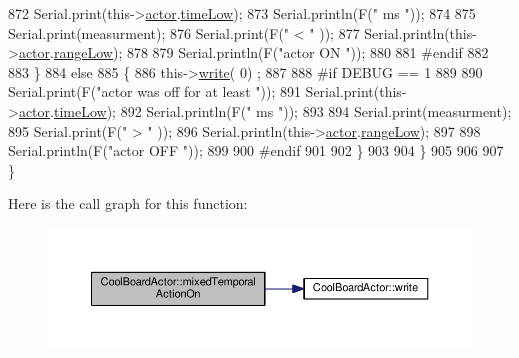 \begin{DoxyCode}
872             Serial.print(this->\hyperlink{class_cool_board_actor_a8f190db9f7a39fddbcef7f152da970e9}{actor}.\hyperlink{struct_cool_board_actor_1_1state_a314c53c146e8c7b12c025323a34fbb9a}{timeLow});
873             Serial.println(F(\textcolor{stringliteral}{" ms "}));
874 
875             Serial.print(measurment);
876             Serial.print(F(\textcolor{stringliteral}{" < "} ));
877             Serial.println(this->\hyperlink{class_cool_board_actor_a8f190db9f7a39fddbcef7f152da970e9}{actor}.\hyperlink{struct_cool_board_actor_1_1state_a43f891c9fb3bb63575c27cec860de55a}{rangeLow});
878     
879             Serial.println(F(\textcolor{stringliteral}{"actor ON "}));
880     
881 \textcolor{preprocessor}{        #endif  }
882 
883         \}
884         \textcolor{keywordflow}{else} 
885         \{
886             this->\hyperlink{class_cool_board_actor_a958786ff01ea1056ee72c72d439f86da}{write}( 0) ;  
887 
888 \textcolor{preprocessor}{        #if DEBUG == 1 }
889 
890             Serial.print(F(\textcolor{stringliteral}{"actor was off for at least "}));
891             Serial.print(this->\hyperlink{class_cool_board_actor_a8f190db9f7a39fddbcef7f152da970e9}{actor}.\hyperlink{struct_cool_board_actor_1_1state_a314c53c146e8c7b12c025323a34fbb9a}{timeLow});
892             Serial.println(F(\textcolor{stringliteral}{" ms "}));
893 
894             Serial.print(measurment);
895             Serial.print(F(\textcolor{stringliteral}{" > "} ));
896             Serial.println(this->\hyperlink{class_cool_board_actor_a8f190db9f7a39fddbcef7f152da970e9}{actor}.\hyperlink{struct_cool_board_actor_1_1state_a43f891c9fb3bb63575c27cec860de55a}{rangeLow});
897 
898             Serial.println(F(\textcolor{stringliteral}{"actor OFF "}));
899     
900 \textcolor{preprocessor}{        #endif              }
901 
902         \}
903 
904     \}
905 
906     
907 \}
\end{DoxyCode}
Here is the call graph for this function\+:
\nopagebreak
\begin{figure}[H]
\begin{center}
\leavevmode
\includegraphics[width=350pt]{dc/d69/class_cool_board_actor_a216aa7a0cfd1f31d0025cc91c2ecd5dd_cgraph}
\end{center}
\end{figure}

